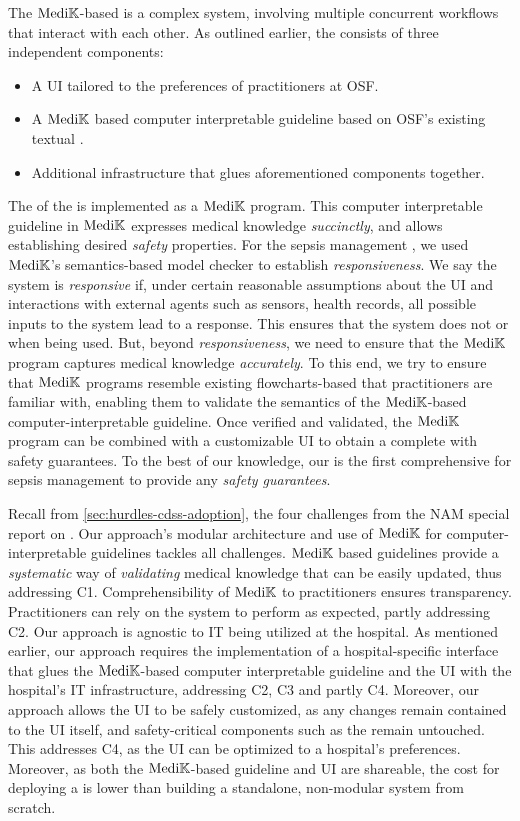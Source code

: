 The $\text{Medi}\mathbb{K}{}$-based \CDSS{} is a complex system, involving multiple
concurrent workflows that interact with each other. As outlined earlier,
the \CDSS{} consists of three independent components:
\begin{itemize}
  \itemsep0.0em
  \item A UI tailored to the preferences of practitioners at OSF.
  \item A $\text{Medi}\mathbb{K}{}{}$ based computer interpretable guideline based on OSF's
    existing textual \BPG{}.
  \item Additional infrastructure that glues aforementioned components together.
\end{itemize}

The \BPGLogic{} of the \CDSS{} is implemented as a $\text{Medi}\mathbb{K}{}{}$ program.
This computer interpretable guideline in $\text{Medi}\mathbb{K}{}$ expresses
medical knowledge \emph{succinctly}, and allows establishing desired \emph{safety} properties.
For the sepsis management \CDSS{}, we used $\text{Medi}\mathbb{K}{}{}$'s semantics-based model checker to
establish \emph{responsiveness}. We say the system is \emph{responsive} if,
under certain reasonable assumptions about the UI and interactions with external
agents such as sensors, health records, all possible inputs to the
system lead to a response. This ensures that the system does not
 or  when being used. But, beyond \emph{responsiveness},
we need to ensure that the $\text{Medi}\mathbb{K}{}{}$ program captures medical knowledge \emph{accurately}.
To this end, we try to ensure that $\text{Medi}\mathbb{K}{}{}$ programs resemble
existing flowcharts-based \BPGs{} that practitioners are familiar with,
enabling them to validate the semantics of the $\text{Medi}\mathbb{K}{}{}$-based
computer-interpretable guideline. Once verified and validated, the $\text{Medi}\mathbb{K}{}{}$ program
can be combined with a customizable UI to obtain a complete \CDSS{} with
safety guarantees. To the best of our knowledge, our is the first
comprehensive \CDSSs{} for sepsis management to provide any \emph{safety
guarantees}.

Recall from \autoref{sec:hurdles-cdss-adoption}, the four challenges from
the NAM{} special report on \CDSSs{}. Our approach's modular architecture and
use of $\text{Medi}\mathbb{K}{}{}$ for computer-interpretable guidelines tackles all
challenges. $\text{Medi}\mathbb{K}{}{}$ based guidelines provide a \emph{systematic} way of
\emph{validating} medical knowledge that can be easily updated, thus addressing
C1. Comprehensibility of $\text{Medi}\mathbb{K}{}{}$ to practitioners ensures transparency.
Practitioners can rely on the system to perform as expected, partly addressing C2.
Our approach is agnostic to IT being utilized at the
hospital. As mentioned earlier, our approach requires the implementation
of a hospital-specific interface that glues the $\text{Medi}\mathbb{K}{}{}$-based
computer interpretable guideline and the UI with the hospital's IT
infrastructure, addressing C2, C3 and partly C4. Moreover,
our approach allows the UI to be safely customized,
as any changes remain contained to the UI itself, and safety-critical
components such as the \BPGLogic{} remain untouched. This addresses C4,
as the UI can be optimized to a hospital's preferences. Moreover,
as both the $\text{Medi}\mathbb{K}{}{}$-based guideline and UI are shareable, the cost
for deploying a \CDSS{} is lower than building a standalone,
non-modular system from scratch.


